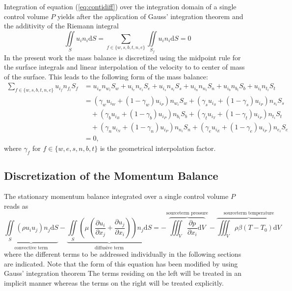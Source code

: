     Integration of equation (\ref{eq:contidiff}) over the integration domain of a single control volume \(P\) yields after the application of Gauss' integration theorem and the additivity of the Riemann integral
    \begin{displaymath}
      \iint\limits_S  u_i n_i \mathrm{d}S = \sum_{f \in \{w,s,b,t,n,e\}} \iint\limits_{S_f}  u_i n_{i} \mathrm{d}S = 0
    \end{displaymath}
    In the present work the mass balance is discretized using the midpoint rule for the surface integrals and linear interpolation of the velocity to to center of mass of the surface. This leads to the following form of the mass balance: 
    \begin{align*}
      \sum_{f \in \{w,s,b,t,n,e\}} u_{i_f} n_{f_i} S_f 
      &= u_{i_w} n_{w_i} S_w + u_{i_e} n_{e_i} S_e 
       + u_{i_s} n_{s_i} S_s + u_{i_n} n_{n_i} S_n 
       + u_{i_b} n_{b_i} S_b + u_{i_t} n_{t_i} S_t  \\
      &= ( \gamma_w u_{i_W} + (1 - \gamma_w ) u_{i_P} ) n_{w_i} S_w + ( \gamma_s u_{i_S} + (1 - \gamma_s ) u_{i_P} ) n_{s_i} S_s \\
      &\quad + ( \gamma_b u_{i_B} + (1 - \gamma_b ) u_{i_P} ) n_{b_i} S_b + ( \gamma_t u_{i_T} + (1 - \gamma_t ) u_{i_P} ) n_{t_i} S_t \\
      &\quad + ( \gamma_n u_{i_N} + (1 - \gamma_n ) u_{i_P} ) n_{n_i} S_n + ( \gamma_e u_{i_E} + (1 - \gamma_e ) u_{i_P} ) n_{e_i} S_e \\
      & =  0,
    \end{align*}
    where \( \gamma_f \) for \( f \in \{w,e,s,n,b,t\} \) is the geometrical interpolation factor.

    \subsection{Discretization of the Momentum Balance}

      The stationary momentum balance integrated over a single control volume \(P\) reads as
      \begin{displaymath}
        \underbrace{\iint\limits_S (\rho u_i u_j)n_j \mathrm{d}S}_{\text{convective term}}
        - \underbrace{\iint\limits_S \left(\mu \left( \frac{\partial u_i}{\partial x_j} + \frac{\partial u_j}{\partial x_i}\right)\right)n_j \mathrm{d}S}_{\text{diffusive term}}
        = - \overbrace{\iiint_V \frac{\partial p}{\partial x_i} \mathrm{d}V}^{\text{sourceterm pressure}}
        - \overbrace{\iiint_V \rho \beta \left(T - T_0\right) \mathrm{d}V}^{\text{sourceterm temperature}}
      \end{displaymath}
      where the different terms to be addressed individually in the following sections are indicated. Note that the form of this equation has been modified by using Gauss' integration theorem The terms residing on the left will be treated in an implicit manner whereas the terms on the right will be treated explicitly. 

